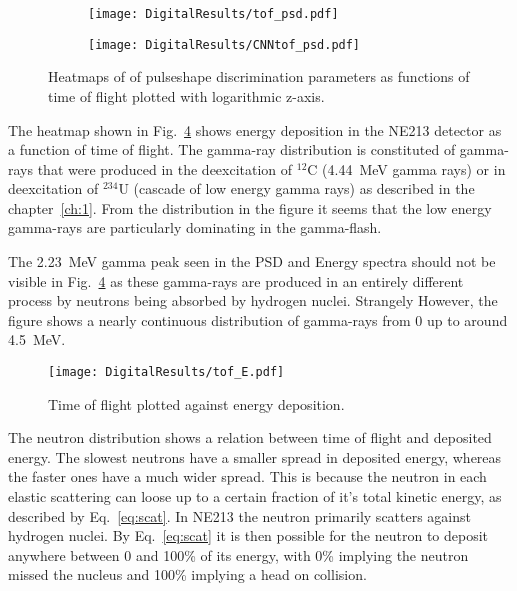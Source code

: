 \documentclass[main.tex]{subfiles}
\begin{document}
\begin{figure}
    \centering
    \begin{subfigure}[ht]{\textwidth}
    	\centering
        \texttt{[image: DigitalResults/tof\_psd.pdf]}
        \caption{}
        \label{fig:tof_digi_cc}
    \end{subfigure}
	\begin{subfigure}[ht]{\textwidth}
		\centering
        \texttt{[image: DigitalResults/CNNtof\_psd.pdf]}
        \caption{}
        \label{fig:tof_digi_cnn}
    \end{subfigure}
    \caption[Pulse shape parameters as function of time of flight, digital setup.]{Heatmaps of of pulseshape discrimination parameters as functions of time of flight plotted with logarithmic z-axis.}
    \label{fig:tof_cc_tof_cnn}
\end{figure}

The heatmap shown in Fig.~\ref{fig:tof_E_d} shows energy deposition in the NE213 detector as a function of time of flight. The gamma-ray distribution is constituted of gamma-rays that were produced in the deexcitation of $^\mathrm{12}$C (\SI{4.44}{MeV} gamma rays) or in deexcitation of $^\mathrm{234}$U (cascade of low energy gamma rays) as described in the chapter~\ref{ch:1}. From the distribution in the figure it seems that the low energy gamma-rays are particularly dominating in the gamma-flash.

The \SI{2.23}{MeV} gamma peak seen in the PSD and Energy spectra should not be visible in Fig.~\ref{fig:tof_E_d} as these gamma-rays are produced in an entirely different process by neutrons being absorbed by hydrogen nuclei. Strangely However, the figure shows a nearly continuous distribution of gamma-rays from 0 up to around \SI{4.5}{MeV}.

\begin{figure}[ht]
    \centering
        \texttt{[image: DigitalResults/tof\_E.pdf]}
        \caption[Time of flight plotted against energy deposition.]{Time of flight plotted against energy deposition.}
    \label{fig:tof_E_d} 
\end{figure}

The neutron distribution shows a relation between time of flight and deposited energy. The slowest neutrons have a smaller spread in deposited energy, whereas the faster ones have a much wider spread. This is because the neutron in each elastic scattering can loose up to a certain fraction of it's total kinetic energy, as described by Eq.~\ref{eq:scat}. In NE213 the neutron primarily scatters against hydrogen nuclei. By Eq.~\ref{eq:scat} it is then possible for the neutron to deposit anywhere between 0 and 100\% of its energy, with 0\% implying the neutron missed the nucleus and 100\% implying a head on collision.
\end{document}
